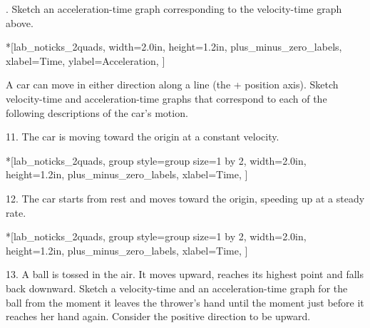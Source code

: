 . Sketch an acceleration-time graph corresponding to the velocity-time graph
above.

\begin{lab_axis}*[lab_noticks_2quads,
	width=2.0in,  height=1.2in,
	plus_minus_zero_labels,
	xlabel=Time,
	ylabel=Acceleration,
	]
\end{lab_axis}

A car can move in either direction along a line (the + position axis). Sketch
velocity-time and acceleration-time graphs that correspond to each of the following
descriptions of the car's motion.

11. The car is moving toward the origin at a constant velocity.

\begin{lab_groupplot}*{}[lab_noticks_2quads,
	group style={group size=1 by 2},
	width=2.0in,  height=1.2in,
	plus_minus_zero_labels,
	xlabel=Time,
	]
\nextgroupplot[
	ylabel=Velocity,
	]
\nextgroupplot[
	ylabel=Acceleration,
	]
\end{lab_groupplot}

12. The car starts from rest and moves toward the origin, speeding up at a steady
rate.

\begin{lab_groupplot}*{}[lab_noticks_2quads,
	group style={group size=1 by 2},
	width=2.0in,  height=1.2in,
	plus_minus_zero_labels,
	xlabel=Time,
	]
\nextgroupplot[
	ylabel=Velocity,
	]
\nextgroupplot[
	ylabel=Acceleration,
	]
\end{lab_groupplot}

13. A ball is tossed in the air. It moves upward, reaches its highest point
and falls back downward. Sketch a velocity-time and an acceleration-time graph
for the ball from the moment it leaves the thrower's hand until the moment just
before it reaches her hand again. Consider the positive direction to be upward.

